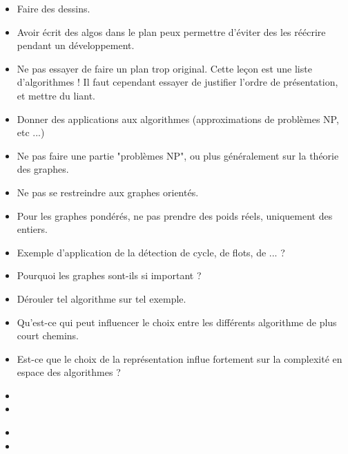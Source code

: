 \documentclass{agregfiche}
\begin{document}
\secpieges

\begin{itemize}
    \item Faire des dessins.
    \item Avoir écrit des algos dans le plan peux permettre d'éviter des les réécrire pendant un développement.
    \item Ne pas essayer de faire un plan trop original. Cette leçon est une liste d'algorithmes ! Il faut cependant essayer de justifier l'ordre de présentation, et mettre du liant.
    \item Donner des applications aux algorithmes (approximations de problèmes NP, etc ...)
    \item Ne pas faire une partie "problèmes NP", ou plus généralement sur la théorie des graphes.
    \item Ne pas se restreindre aux graphes orientés.
    \item Pour les graphes pondérés, ne pas prendre des poids réels, uniquement des entiers.
\end{itemize}

\secquestionsclassiques

\begin{itemize}
    \item Exemple d'application de la détection de cycle, de flots, de ... ?
    \item Pourquoi les graphes sont-ils si important ?
    \item Dérouler tel algorithme sur tel exemple.
    \item Qu'est-ce qui peut influencer le choix entre les différents algorithme de plus court chemins.
    \item Est-ce que le choix de la représentation influe fortement sur la complexité en espace des algorithmes ?
\end{itemize}

\secreferences

\begin{itemize}
    \item 
    \item 
\end{itemize}

\secdev

\begin{itemize}
	\item 
	\item 
\end{itemize}
\end{document}
